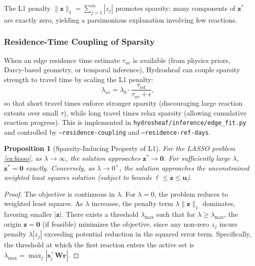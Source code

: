 \documentclass[12pt,a4paper]{article}
\theoremstyle{plain}
\newtheorem{proposition}[theorem]{Proposition}
\theoremstyle{definition}
\theoremstyle{remark}
\begin{document}
The L1 penalty $\|\mathbf{z}\|_1 = \sum_{j=1}^m |z_j|$ promotes sparsity: many components of $\mathbf{z}^*$ are exactly zero, yielding a parsimonious explanation involving few reactions.

\subsubsection{Residence-Time Coupling of Sparsity}

When an edge residence time estimate $\tau_{uv}$ is available (from physics priors, Darcy-based geometry, or temporal inference), Hydrosheaf can couple sparsity strength to travel time by scaling the L1 penalty:
\begin{equation}
	\lambda_{uv} = \lambda_0 \cdot \frac{\tau_{\mathrm{ref}}}{\tau_{uv} + \epsilon},
\end{equation}
so that short travel times enforce stronger sparsity (discouraging large reaction extents over small $\tau$), while long travel times relax sparsity (allowing cumulative reaction progress). This is implemented in \texttt{hydrosheaf/inference/edge\_fit.py} and controlled by \texttt{--residence-coupling} and \texttt{--residence-ref-days}.

\begin{proposition}[Sparsity-Inducing Property of L1]\label{prop:l1_sparsity}
	For the LASSO problem \eqref{eq:lasso}, as $\lambda \to \infty$, the solution approaches $\mathbf{z}^* \to \mathbf{0}$. For sufficiently large $\lambda$, $\mathbf{z}^* = \mathbf{0}$ exactly. Conversely, as $\lambda \to 0^+$, the solution approaches the unconstrained weighted least squares solution (subject to bounds $\boldsymbol{\ell} \leq \mathbf{z} \leq \mathbf{u}$).
\end{proposition}

\begin{proof}
	The objective is continuous in $\lambda$. For $\lambda = 0$, the problem reduces to weighted least squares. As $\lambda$ increases, the penalty term $\lambda \|\mathbf{z}\|_1$ dominates, favoring smaller $|\mathbf{z}|$. There exists a threshold $\lambda_{\max}$ such that for $\lambda \geq \lambda_{\max}$, the origin $\mathbf{z} = \mathbf{0}$ (if feasible) minimizes the objective, since any non-zero $z_j$ incurs penalty $\lambda |z_j|$ exceeding potential reduction in the squared error term. Specifically, the threshold at which the first reaction enters the active set is $\lambda_{\max} = \max_j |\mathbf{s}_j^\top \mathbf{W} \mathbf{r}|$.
\end{proof}
\end{document}
